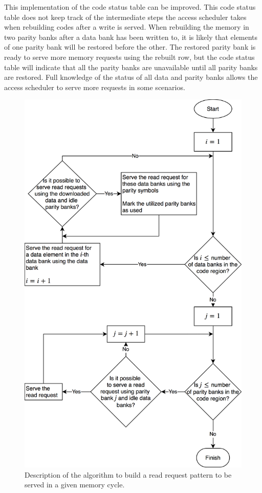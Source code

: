 This implementation of the code status table can be improved. This code status table does not keep track of the intermediate steps the access scheduler takes when rebuilding codes after a write is served. When rebuilding the memory in two parity banks after a data bank has been written to, it is likely that elements of one parity bank will be restored before the other. The restored parity bank is ready to serve more memory requests using the rebuilt row, but the code status table will indicate that all the parity banks are unavailable until all parity banks are restored. Full knowledge of the status of all data and parity banks allows the access scheduler to serve more requests in some scenarios. 


\begin{figure}[t!]
	\includegraphics[width=0.96\linewidth]{fig/read_pattern_algo.png}
	\caption{{Description of the algorithm to build a read request pattern to be served in a given memory cycle.}}
	\label{fig:readAlgo}
\end{figure}
